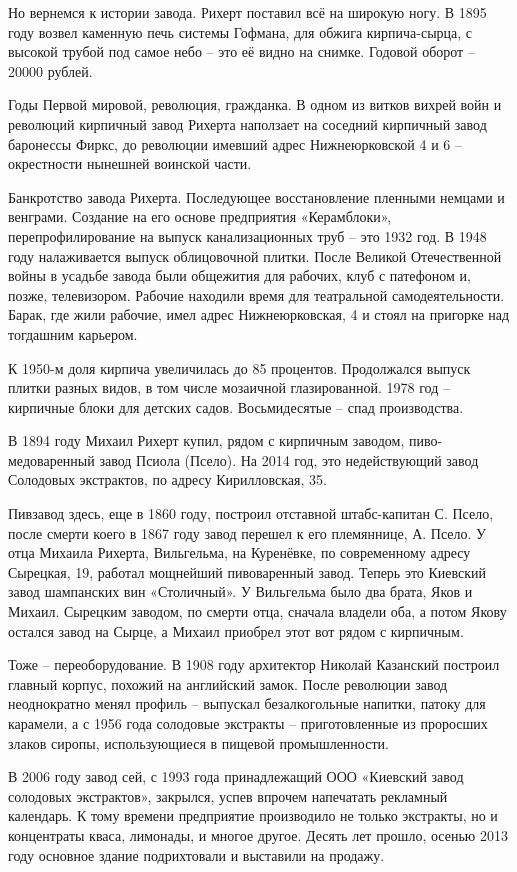 Но вернемся к истории завода. Рихерт поставил всё на широкую ногу. В 1895 году возвел каменную печь системы Гофмана, для обжига кирпича-сырца, с высокой трубой под самое небо – это её видно на снимке. Годовой оборот – 20000 рублей.

Годы Первой мировой, революция, гражданка. В одном из витков вихрей войн и революций кирпичный завод Рихерта наползает на соседний кирпичный завод баронессы Фиркс, до революции имевший адрес Нижнеюрковской 4 и 6 – окрестности нынешней воинской части.

Банкротство завода Рихерта. Последующее восстановление пленными немцами и венграми. Создание на его основе предприятия «Керамблоки», перепрофилирование на выпуск канализационных труб – это 1932 год. В 1948 году налаживается выпуск облицовочной плитки. После Великой Отечественной войны в усадьбе завода были общежития для рабочих, клуб с патефоном и, позже, телевизором. Рабочие находили время для театральной самодеятельности. Барак, где жили рабочие, имел адрес Нижнеюрковская, 4 и стоял на пригорке над тогдашним карьером.

К 1950-м доля кирпича увеличилась до 85 процентов. Продолжался выпуск плитки разных видов, в том числе мозаичной глазированной. 1978 год – кирпичные блоки для детских садов. Восьмидесятые – спад производства.

В 1894 году Михаил Рихерт купил, рядом с кирпичным заводом, пиво-медоваренный завод Псиола (Псело). На 2014 год, это недействующий завод Солодовых экстрактов, по адресу Кирилловская, 35. 

Пивзавод здесь, еще в 1860 году, построил отставной штабс-капитан С. Псело, после смерти коего в 1867 году завод перешел к его племяннице, А. Псело. У отца Михаила Рихерта, Вильгельма, на Куренёвке, по современному адресу Сырецкая, 19, работал мощнейший пивоваренный завод. Теперь это Киевский завод шампанских вин «Столичный». У Вильгельма было два брата, Яков и Михаил. Сырецким заводом, по смерти отца, сначала владели оба, а потом Якову остался завод на Сырце, а Михаил приобрел этот вот рядом с кирпичным.

Тоже – переоборудование. В 1908 году архитектор Николай Казанский построил главный корпус, похожий на английский замок. После революции завод неоднократно менял профиль – выпускал безалкогольные напитки, патоку для карамели, а с 1956 года солодовые экстракты – приготовленные из проросших злаков сиропы, использующиеся в пищевой промышленности. 

В 2006 году завод сей, с 1993 года принадлежащий ООО «Киевский завод солодовых экстрактов», закрылся, успев впрочем напечатать рекламный календарь. К тому времени предприятие производило не только экстракты, но и концентраты кваса, лимонады, и многое другое. Десять лет прошло, осенью 2013 году основное здание подрихтовали и выставили на продажу. 

